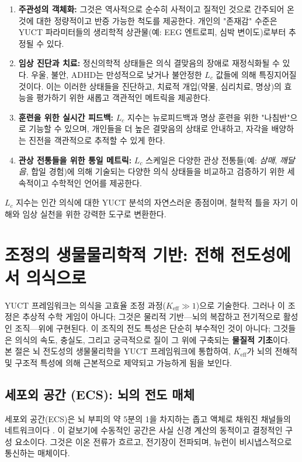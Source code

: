 \documentclass[12pt,a4paper]{article}
\begin{document}
	\begin{enumerate}
		\item \textbf{주관성의 객체화:} 그것은 역사적으로 순수히 사적이고 질적인 것으로 간주되어 온 것에 대한 정량적이고 반증 가능한 척도를 제공한다. 개인의 "존재감" 수준은 YUCT 파라미터들의 생리학적 상관물(예: EEG 엔트로피, 심박 변이도)로부터 추정될 수 있다.
		\item \textbf{임상 진단과 치료:} 정신의학적 상태들은 의식 결맞음의 장애로 재정식화될 수 있다. 우울, 불안, ADHD는 만성적으로 낮거나 불안정한 \(L_c\) 값들에 의해 특징지어질 것이다. 이는 이러한 상태들을 진단하고, 치료적 개입(약물, 심리치료, 명상)의 효능을 평가하기 위한 새롭고 객관적인 메트릭을 제공한다.
		\item \textbf{훈련을 위한 실시간 피드백:} \(L_c\) 지수는 뉴로피드백과 명상 훈련을 위한 "나침반"으로 기능할 수 있으며, 개인들을 더 높은 결맞음의 상태로 안내하고, 자각을 배양하는 진전을 객관적으로 추적할 수 있게 한다.
		\item \textbf{관상 전통들을 위한 통일 메트릭:} \(L_c\) 스케일은 다양한 관상 전통들(예: \textit{삼매}, \textit{깨달음}, 합일 경험)에 의해 기술되는 다양한 의식 상태들을 비교하고 검증하기 위한 세속적이고 수학적인 언어를 제공한다.
	\end{enumerate}
	
	\(L_c\) 지수는 인간 의식에 대한 YUCT 분석의 자연스러운 종점이며, 철학적 틀을 자기 이해와 임상 실천을 위한 강력한 도구로 변환한다.
	
	\section{조정의 생물물리학적 기반: 전해 전도성에서 의식으로}
	
	YUCT 프레임워크는 의식을 고효율 조정 과정(\(K_{\mathrm{eff}} \gg 1\))으로 기술한다. 그러나 이 조정은 추상적 수학 게임이 아니다; 그것은 물리적 기반—뇌의 복잡하고 전기적으로 활성인 조직—위에 구현된다. 이 조직의 전도 특성은 단순히 부수적인 것이 아니다; 그것들은 의식의 속도, 충실도, 그리고 궁극적으로 질이 그 위에 구축되는 \textbf{물질적 기초}이다. 본 절은 뇌 전도성의 생물물리학을 YUCT 프레임워크에 통합하여, \(K_{\mathrm{eff}}\)가 뇌의 전해적 및 구조적 특성에 의해 근본적으로 제약되고 가능하게 됨을 보인다.
	
	\subsection{세포외 공간 (ECS): 뇌의 전도 매체}
	
	세포외 공간(ECS)은 뇌 부피의 약 5분의 1을 차지하는 좁고 액체로 채워진 채널들의 네트워크이다 \cite{Nicholson2006}. 이 겉보기에 수동적인 공간은 사실 신경 계산의 동적이고 결정적인 구성 요소이다. 그것은 이온 전류가 흐르고, 전기장이 전파되며, 뉴런이 비시냅스적으로 통신하는 매체이다.
	
\end{document}

